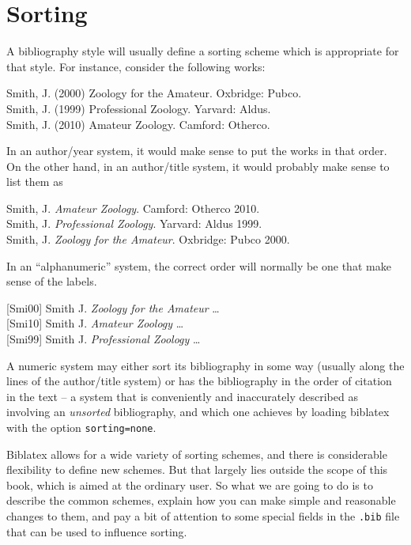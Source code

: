 \chapter{Sorting}

A bibliography style will usually define a sorting scheme which is
appropriate for that style. For instance, consider the following works:

\medskip
\colorbox{red!40}{Smith, J. (2000) Zoology for the Amateur. Oxbridge: Pubco.}\\
\colorbox{green!40}{Smith, J. (1999) Professional Zoology. Yarvard: Aldus.}\\
\colorbox{blue!40}{Smith, J. (2010) Amateur Zoology. Camford: Otherco.}
\medskip

In an author/year system, it would make sense to put the works in that
order. On the other hand, in an author/title system, it would probably
make sense to list them as

\medskip
\colorbox{blue!40}{Smith, J. \emph{Amateur Zoology}. Camford: Otherco 2010.}\\
\colorbox{green!40}{Smith, J. \emph{Professional Zoology}. Yarvard: Aldus 1999.}\\
\colorbox{red!40}{Smith, J. \emph{Zoology for the Amateur}. Oxbridge: Pubco 2000.}
\medskip

In an ``alphanumeric'' system, the correct order will normally be one
that make sense of the labels.

\medskip
\colorbox{red!40}{{[}Smi00{]} Smith J. \emph{Zoology for the Amateur} \ldots{}}\\
\colorbox{blue!40}{{[}Smi10{]} Smith J. \emph{Amateur Zoology} \ldots{}}\\
\colorbox{green!40}{{[}Smi99{]} Smith J. \emph{Professional Zoology} \ldots{}}
\medskip

A numeric system may either sort its bibliography in some way (usually
along the lines of the author/title system) or has the bibliography in
the order of citation in the text -- a system that is conveniently and
inaccurately described as involving an \emph{unsorted} bibliography, and
which one achieves by loading biblatex with the option
\texttt{sorting=none}.

Biblatex allows for a wide variety of sorting schemes, and there is
considerable flexibility to define new schemes. But that largely lies
outside the scope of this book, which is aimed at the ordinary user. So
what we are going to do is to describe the common schemes, explain how
you can make simple and reasonable changes to them, and pay a bit of
attention to some special fields in the \texttt{.bib} file that can be
used to influence sorting.

